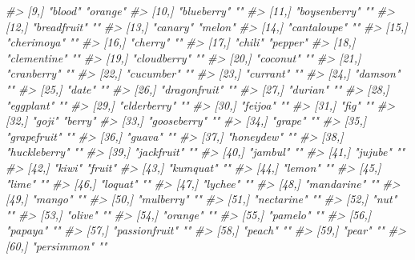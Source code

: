 \documentclass[]{book}
\newenvironment{Shaded}{\begin{snugshade}}{\end{snugshade}}
\newcommand{\CommentTok}[1]{\textcolor[rgb]{0.56,0.35,0.01}{\textit{#1}}}
\theoremstyle{definition}
\theoremstyle{definition}
\theoremstyle{definition}
\theoremstyle{remark}
\begin{document}
\begin{Shaded}
\begin{Highlighting}[]
{{\CommentTok{#>  [9,] "blood"        "orange"    }
\CommentTok{#> [10,] "blueberry"    ""          }
\CommentTok{#> [11,] "boysenberry"  ""          }
\CommentTok{#> [12,] "breadfruit"   ""          }
\CommentTok{#> [13,] "canary"       "melon"     }
\CommentTok{#> [14,] "cantaloupe"   ""          }
\CommentTok{#> [15,] "cherimoya"    ""          }
\CommentTok{#> [16,] "cherry"       ""          }
\CommentTok{#> [17,] "chili"        "pepper"    }
\CommentTok{#> [18,] "clementine"   ""          }
\CommentTok{#> [19,] "cloudberry"   ""          }
\CommentTok{#> [20,] "coconut"      ""          }
\CommentTok{#> [21,] "cranberry"    ""          }
\CommentTok{#> [22,] "cucumber"     ""          }
\CommentTok{#> [23,] "currant"      ""          }
\CommentTok{#> [24,] "damson"       ""          }
\CommentTok{#> [25,] "date"         ""          }
\CommentTok{#> [26,] "dragonfruit"  ""          }
\CommentTok{#> [27,] "durian"       ""          }
\CommentTok{#> [28,] "eggplant"     ""          }
\CommentTok{#> [29,] "elderberry"   ""          }
\CommentTok{#> [30,] "feijoa"       ""          }
\CommentTok{#> [31,] "fig"          ""          }
\CommentTok{#> [32,] "goji"         "berry"     }
\CommentTok{#> [33,] "gooseberry"   ""          }
\CommentTok{#> [34,] "grape"        ""          }
\CommentTok{#> [35,] "grapefruit"   ""          }
\CommentTok{#> [36,] "guava"        ""          }
\CommentTok{#> [37,] "honeydew"     ""          }
\CommentTok{#> [38,] "huckleberry"  ""          }
\CommentTok{#> [39,] "jackfruit"    ""          }
\CommentTok{#> [40,] "jambul"       ""          }
\CommentTok{#> [41,] "jujube"       ""          }
\CommentTok{#> [42,] "kiwi"         "fruit"     }
\CommentTok{#> [43,] "kumquat"      ""          }
\CommentTok{#> [44,] "lemon"        ""          }
\CommentTok{#> [45,] "lime"         ""          }
\CommentTok{#> [46,] "loquat"       ""          }
\CommentTok{#> [47,] "lychee"       ""          }
\CommentTok{#> [48,] "mandarine"    ""          }
\CommentTok{#> [49,] "mango"        ""          }
\CommentTok{#> [50,] "mulberry"     ""          }
\CommentTok{#> [51,] "nectarine"    ""          }
\CommentTok{#> [52,] "nut"          ""          }
\CommentTok{#> [53,] "olive"        ""          }
\CommentTok{#> [54,] "orange"       ""          }
\CommentTok{#> [55,] "pamelo"       ""          }
\CommentTok{#> [56,] "papaya"       ""          }
\CommentTok{#> [57,] "passionfruit" ""          }
\CommentTok{#> [58,] "peach"        ""          }
\CommentTok{#> [59,] "pear"         ""          }
\CommentTok{#> [60,] "persimmon"    ""          }
}}
\end{Highlighting}
\end{Shaded}
\end{document}
